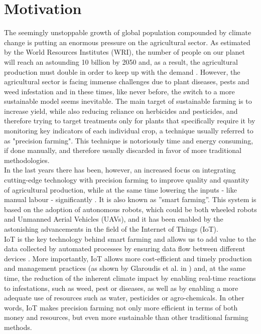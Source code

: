 \chapter{Motivation}
The seemingly unstoppable growth of global population compounded by climate change is putting an enormous pressure on the agricultural sector. As estimated by the World Resources Institutes (WRI), the number of people on our planet will reach an astounding 10 billion by 2050  \cite{ayaz_internet--things_2019} and, as a result, the agricultural production must double in order to keep up with the demand \cite{singh_machine_2016}. However, the agricultural sector is facing immense challenges due to plant diseases, pests and weed infestation and in these times, like never before, the switch to a more sustainable model seems inevitable. The main target of sustainable farming is to increase yield, while also reducing reliance on herbicides and pesticides, and therefore trying to target treatments only for plants that specifically require it by monitoring key indicators of each individual crop, a technique usually referred to as "precision farming". This technique is notoriously time and energy consuming, if done manually, and therefore usually discarded in favor of more traditional methodologies. \cite{lottes_effective_2016}\\
In the last years there has been, however, an increased focus on integrating cutting-edge technology with precision farming to improve quality and quantity of agricultural production, while at the same time lowering the inputs - like manual labour - significantly \cite{islam_review_2021}.  It is also known as ''smart farming''.  This system is based on the adoption of autonomous robots, which could be both wheeled robots and Unmanned Aerial Vehicles (UAVs), and it has been enabled by the astonishing advancements in the field of the Internet of Things (IoT). \\
IoT is the key technology behind smart farming and allows us to add value to the data collected by automated processes by ensuring data flow between different devices  \cite{islam_review_2021}.  More importantly, IoT allows more cost-efficient and timely production and management practices (as shown by  Glaroudis et al. in \cite{glaroudis_survey_2020}) and, at the same time, the reduction of the inherent climate impact by enabling real-time reactions to infestations,  such as weed, pest or diseases, as well as by enabling a more adequate use of resources such as water, pesticides or agro-chemicals. \cite{islam_review_2021}
In other words, IoT makes precision farming not only more efficient in terms of both money and resources, but even more sustainable than other traditional farming methods. \\
